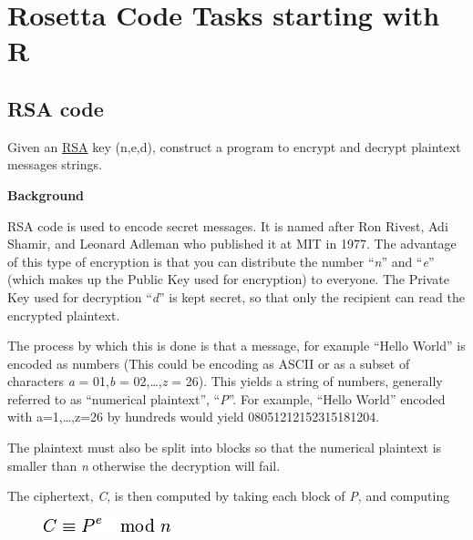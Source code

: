 %
%
%

\chapter{Rosetta Code Tasks starting with R}

\section*{RSA code}

Given an \href{http://en.wikipedia.org/wiki/RSA}{RSA} key (n,e,d),
construct a program to encrypt and decrypt plaintext messages strings.

\textbf{Background}

RSA code is used to encode secret messages. It is named after Ron
Rivest, Adi Shamir, and Leonard Adleman who published it at MIT in 1977.
The advantage of this type of encryption is that you can distribute the
number ``\emph{n}'' and ``\emph{e}'' (which makes up the Public Key used
for encryption) to everyone. The Private Key used for decryption
``\emph{d}'' is kept secret, so that only the recipient can read the
encrypted plaintext.

The process by which this is done is that a message, for example ``Hello
World'' is encoded as numbers (This could be encoding as ASCII or as a
subset of characters \emph{a} = 01,\emph{b} = 02,\ldots{},\emph{z} =
26). This yields a string of numbers, generally referred to as
``numerical plaintext'', ``\emph{P}''. For example, ``Hello World''
encoded with a=1,\ldots{},z=26 by hundreds would yield
08051212152315181204.

The plaintext must also be split into blocks so that the numerical
plaintext is smaller than \emph{n} otherwise the decryption will fail.

The ciphertext, \emph{C}, is then computed by taking each block of
\emph{P}, and computing

\begin{figure}[H]
\centering
\includegraphics[scale=.6]{graphics/eb1b9606546b68de1ad6063ac988df6c.png}
\end{figure}

